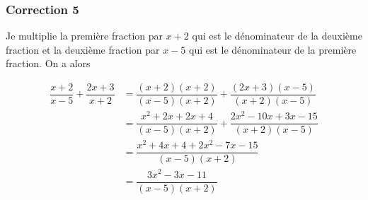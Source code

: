 \documentclass[15pt, mathserif]{beamer}
\begin{document}
\begin{frame}
\vspace{-10mm}
	\frametitle{Correction 5}


\bigskip 

Je multiplie la première fraction par $x+2$ qui est le dénominateur de la deuxième fraction et la deuxième fraction par $x-5$ qui est le dénominateur de la première fraction. On a alors 

 \begin{align*} \dfrac{x+2}{x-5} + \dfrac{2x+3}{x+2} &= \dfrac{(x+2)(x+2)}{(x-5)(x+2)} + \dfrac{(2x+3)(x-5)}{(x+2)(x-5)}\\ &= \dfrac{x^2+2x+2x+4}{(x-5)(x+2)}+ \dfrac{2x^2-10x+3x-15}{(x+2)(x-5)} \\
	&=\dfrac{x^2+4x+4+2x^2-7x-15}{(x-5)(x+2)}\\
	&=\dfrac{3x^2-3x-11}{(x-5)(x+2)}
\end{align*}\end{frame}
\end{document}
